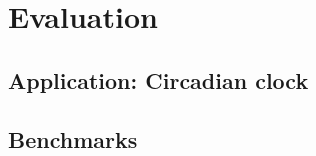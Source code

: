 \section{Evaluation}
\label{sec:evaluation}
\subsection{Application: Circadian clock}


\subsection{Benchmarks}

